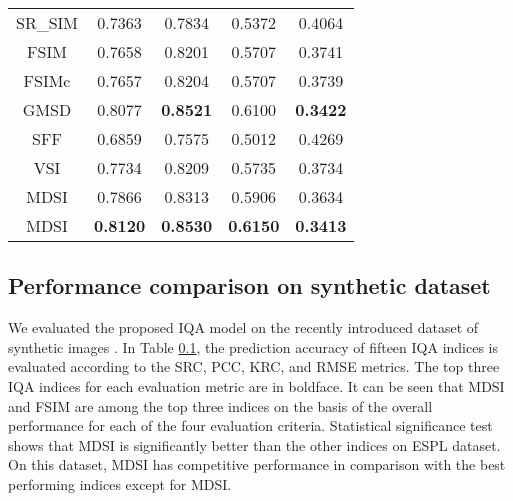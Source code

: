 \begin{table}[htb]
\begin{tabular}{c|cccc}
SR\_SIM \cite{SRSIM}                       & 0.7363                              & 0.7834                              & 0.5372                              & 0.4064                              \\
FSIM \cite{FSIM}                          & 0.7658                              & 0.8201                              & 0.5707                              & 0.3741                              \\
FSIMc \cite{FSIM}                         & 0.7657                              & 0.8204                              & 0.5707                              & 0.3739                              \\
GMSD \cite{GMSD}                          & 0.8077                              & \textbf{0.8521}                     & 0.6100                              & \textbf{0.3422}                     \\
SFF \cite{SFF}                           & 0.6859                              & 0.7575                              & 0.5012                              & 0.4269                              \\
VSI \cite{VSI}                           & 0.7734                              & 0.8209                              & 0.5735                              & 0.3734                              \\
MDSI                          & 0.7866                              & 0.8313                              & 0.5906                              & 0.3634                              \\
MDSI & \textbf{0.8120} & \textbf{0.8530} & \textbf{0.6150} & \textbf{0.3413} \\ \hline
\end{tabular}
\end{table}




\subsection{Performance comparison on synthetic dataset}
\label{synthetic}

We evaluated the proposed IQA model on the recently introduced dataset of synthetic images \cite{ESPL}. In Table \ref{synthetic}, the prediction accuracy of fifteen IQA indices is evaluated according to the SRC, PCC, KRC, and RMSE metrics. The top three IQA indices for each evaluation metric are in boldface. It can be seen that MDSI and FSIM are among the top three indices on the basis of the overall performance for each of the four evaluation criteria. Statistical significance test shows that MDSI is significantly better than the other indices on ESPL dataset. On this dataset, MDSI has competitive performance in comparison with the best performing indices except for MDSI. 

